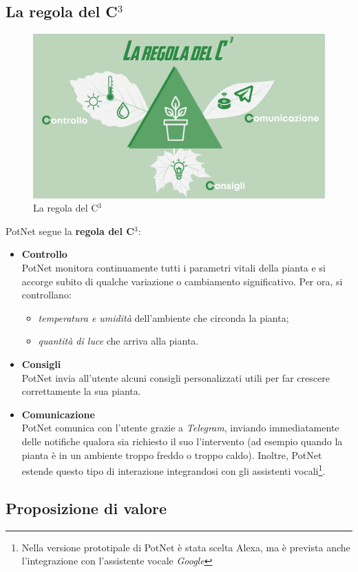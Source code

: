 \subsection{La regola del C$^3$}

\begin{figure}[h]
	\centering
	\includegraphics[width=.5\textwidth]{images/c3_rule.png}
	\caption{La regola del C$^3$}
	\label{fig:c3rule}
\end{figure}

PotNet segue la \textbf{regola del C$^3$}:
\begin{itemize}
	\item \textbf{Controllo}\\
	PotNet monitora continuamente tutti i parametri vitali della pianta e si accorge subito di qualche variazione o cambiamento significativo. Per ora, si controllano:
	\begin{itemize}
		\item \textit{temperatura e umidità} dell'ambiente che circonda la pianta;
		\item \textit{quantità di luce} che arriva alla pianta.
	\end{itemize}
	
	\item \textbf{Consigli}\\
	PotNet invia all'utente alcuni consigli personalizzati utili per far crescere correttamente la sua pianta.
	
	\item \textbf{Comunicazione}\\
	PotNet comunica con l'utente grazie a \textit{Telegram}, inviando immediatamente delle notifiche qualora sia richiesto il suo l'intervento (ad esempio quando la pianta è in un ambiente troppo freddo o troppo caldo). Inoltre, PotNet estende questo tipo di interazione integrandosi con gli assistenti vocali\footnote{Nella versione prototipale di PotNet è stata scelta Alexa, ma è prevista anche l'integrazione con l'assistente vocale \textit{Google}}.
\end{itemize}

\subsection{Proposizione di valore}

